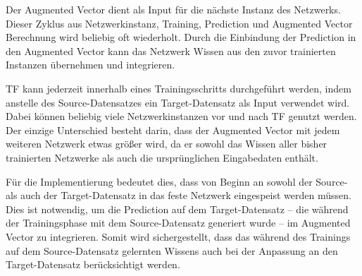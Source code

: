 Der Augmented Vector dient als Input für die nächste Instanz des Netzwerks. Dieser Zyklus aus Netzwerkinstanz, Training, Prediction und 
Augmented Vector Berechnung wird beliebig oft wiederholt. Durch die Einbindung der Prediction in den Augmented Vector kann das Netzwerk 
Wissen aus den zuvor trainierten Instanzen übernehmen und integrieren.

TF kann jederzeit innerhalb eines Trainingsschritts durchgeführt werden, indem anstelle des Source-Datensatzes 
ein Target-Datensatz als Input verwendet wird. Dabei können beliebig viele Netzwerkinstanzen vor und nach 
TF genutzt werden. Der einzige Unterschied besteht darin, dass der Augmented Vector mit jedem weiteren Netzwerk etwas 
größer wird, da er sowohl das Wissen aller bisher trainierten Netzwerke als auch die ursprünglichen Eingabedaten enthält.

Für die Implementierung bedeutet dies, dass von Beginn an sowohl der Source- als auch der Target-Datensatz in das feste Netzwerk eingespeist 
werden müssen. Dies ist notwendig, um die Prediction auf dem Target-Datensatz – die während der Trainingsphase mit dem Source-Datensatz generiert 
wurde – im Augmented Vector zu integrieren. Somit wird sichergestellt, dass das während des Trainings auf dem Source-Datensatz gelernten 
Wissens auch bei der Anpassung an den Target-Datensatz berücksichtigt werden.
